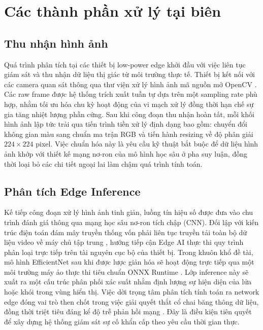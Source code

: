 \documentclass[12pt,a4paper]{report}
\begin{document}
\section{Các thành phần xử lý tại biên}

\subsection{Thu nhận hình ảnh}
Quá trình phân tích tại các thiết bị low-power edge khởi đầu với việc liên tục giám sát và thu nhận dữ liệu thị giác từ môi trường thực tế. Thiết bị kết nối với các camera quan sát thông qua thư viện xử lý hình ảnh mã nguồn mở OpenCV \cite{opencv}. Các raw frame được hệ thống trích xuất tuần tự dựa trên một sampling rate phù hợp, nhằm tối ưu hóa chu kỳ hoạt động của vi mạch xử lý đồng thời hạn chế sự gia tăng nhiệt lượng phần cứng. Sau khi công đoạn thu nhận hoàn tất, mỗi khối hình ảnh lập tức trải qua tiến trình tiền xử lý định dạng bao gồm: chuyển đổi không gian màu sang chuẩn ma trận RGB và tiến hành resizing về độ phân giải $224 \times 224$ pixel. Việc chuẩn hóa này là yêu cầu kỹ thuật bắt buộc để dữ liệu hình ảnh khớp với thiết kế mạng nơ-ron của mô hình học sâu ở pha suy luận, đồng thời loại bỏ các chi tiết ngoại lai làm chậm quá trình tính toán.

\subsection{Phân tích Edge Inference}
Kế tiếp công đoạn xử lý hình ảnh tinh giản, luồng tín hiệu số được đưa vào chu trình đánh giá thông qua mạng học sâu nơ-ron tích chập (CNN). Đối lập với kiến trúc điện toán đám mây truyền thống vốn phải liên tục truyền tải toàn bộ dữ liệu video về máy chủ tập trung \cite{edgeai_bandwidth}, hướng tiếp cận Edge AI thực thi quy trình phân loại trực tiếp trên tài nguyên cục bộ của thiết bị. Trong khuôn khổ đề tài, mô hình EfficientNet sau khi được lược giản hóa sẽ hoạt động trực tiếp qua một môi trường máy ảo thực thi tiêu chuẩn ONNX Runtime \cite{onnxruntime}. Lớp inference này sẽ xuất ra một cấu trúc phân phối xác suất nhằm định lượng sự hiện diện của lửa hoặc khói trong vùng hiển thị. Việc dời trọng tâm phân tích tính toán ra network edge đóng vai trò then chốt trong việc giải quyết thắt cổ chai băng thông dữ liệu, đồng thời triệt tiêu đáng kể độ trễ phản hồi mạng \cite{edgeai_latency}. Đây là điều kiện tiên quyết để xây dựng hệ thống giám sát sự cố khẩn cấp theo yêu cầu thời gian thực.
\end{document}
